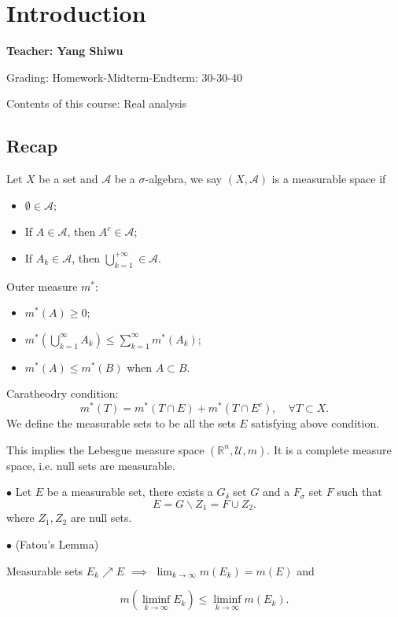 \section{Introduction}
\label{sec:Introduction}
\begin{center}
	\sffamily\large\bfseries Teacher: Yang Shiwu
\end{center}

Grading: Homework-Midterm-Endterm: 30-30-40

Contents of this course: Real analysis

\subsection{Recap}
\label{sub:Recap}
\begin{definition}
	Let $X$ be a set and $\mathcal{A}$ be a $\sigma$-algebra,
	we say  $(X, \mathcal{A})$ is a measurable space if
	\begin{itemize}
		\item $\emptyset \in \mathcal{A}$;
		\item If $A\in \mathcal{A}$, then $A^c\in \mathcal{A}$;
		\item If  $A_k\in \mathcal{A}$, then $\bigcup_{k=1}^{+\infty } \in \mathcal{A}$.
	\end{itemize}
\end{definition}

Outer measure $m^*$:
\begin{itemize}
	\item $m^*(A)\ge 0$;
	\item  $m^*(\bigcup_{k=1}^{\infty }A_k)\le \sum_{k=1}^{\infty} m^*(A_k)$;
	\item $m^*(A)\le m^*(B)$ when $A\subset B$.
\end{itemize}

Caratheodry condition:
\[
m^*(T) = m^*(T \cap E) + m^*(T \cap E^c),\quad \forall T \subset X
.\]
We define the measurable sets to be all the sets $E$ satisfying above condition.

This implies the Lebesgue measure space $(\mathbb{R}^n, \mathscr{U}, m)$.
It is a complete measure space, i.e. null sets are measurable.

\begin{proposition}
	
	$\bullet$ Let $E$ be a measurable set, there exists 
	a $G_{\delta}$ set $G$ and a $F_{\sigma}$ set $F$
	such that
	 \[
		 E = G\backslash Z_1 = F \cup Z_2
	.\]
	where $Z_1,Z_2$ are null sets.

	\noindent $\bullet$ (Fatou's Lemma)
	
	 Measurable sets $E_k\nearrow E$  $\implies$  $ \lim_{k \to \infty}m(E_k) = m(E)$ and

	 \[
		 m\left(\liminf_{k\to \infty}E_k\right)\le \liminf_{k\to \infty}m(E_k)
	.\]
\end{proposition}

